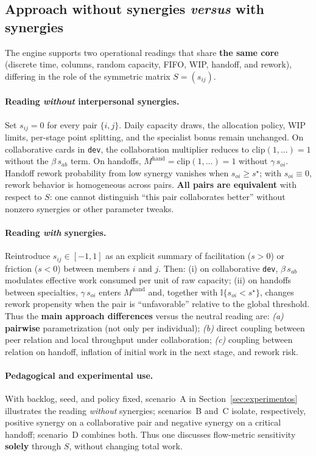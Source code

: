 \subsection{Approach without synergies \emph{versus} with synergies}
\label{sec:sinergia-neutral-vs}

The engine supports two operational readings that share \textbf{the same core} (discrete time, columns, random capacity, FIFO, WIP, handoff, and rework), differing in the role of the symmetric matrix $S=(s_{ij})$.

\paragraph{Reading \emph{without} interpersonal synergies.}
Set $s_{ij}=0$ for every pair $\{i,j\}$. Daily capacity draws, the allocation policy, WIP limits, per-stage point splitting, and the specialist bonus remain unchanged. On collaborative cards in \texttt{dev}, the collaboration multiplier reduces to $\mathrm{clip}(1,\ldots)=1$ without the $\beta\,s_{ab}$ term. On handoffs, $M^{\text{hand}}=\mathrm{clip}(1,\ldots)=1$ without $\gamma\,s_{oi}$. Handoff rework probability from low synergy vanishes when $s_{oi}\ge s^\star$; with $s_{oi}\equiv 0$, rework behavior is homogeneous across pairs. \textbf{All pairs are equivalent} with respect to $S$: one cannot distinguish ``this pair collaborates better'' without nonzero synergies or other parameter tweaks.

\paragraph{Reading \emph{with} synergies.}
Reintroduce $s_{ij}\in[-1,1]$ as an explicit summary of facilitation ($s>0$) or friction ($s<0$) between members $i$ and $j$. Then: (i) on collaborative \texttt{dev}, $\beta\,s_{ab}$ modulates effective work consumed per unit of raw capacity; (ii) on handoffs between specialties, $\gamma\,s_{oi}$ enters $M^{\text{hand}}$ and, together with $\mathbb{I}\{s_{oi}<s^\star\}$, changes rework propensity when the pair is ``unfavorable'' relative to the global threshold. Thus the \textbf{main approach differences} versus the neutral reading are: \emph{(a)} \textbf{pairwise} parametrization (not only per individual); \emph{(b)} direct coupling between peer relation and local throughput under collaboration; \emph{(c)} coupling between relation on handoff, inflation of initial work in the next stage, and rework risk.

\paragraph{Pedagogical and experimental use.}
With backlog, seed, and policy fixed, scenario~A in Section~\ref{sec:experimentos} illustrates the reading \emph{without} synergies; scenarios~B and~C isolate, respectively, positive synergy on a collaborative pair and negative synergy on a critical handoff; scenario~D combines both. Thus one discusses flow-metric sensitivity \textbf{solely} through $S$, without changing total work.

